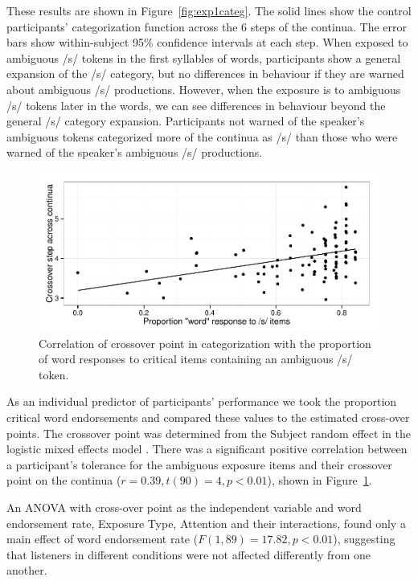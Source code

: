 These results are shown in Figure~\ref{fig:exp1categ}.  
The solid lines show the control participants' categorization function across the 6 steps of the continua.  
The error bars show within-subject 95\% confidence intervals at each step.  
When exposed to ambiguous /s/ tokens in the first syllables of words, participants show a general expansion of the /s/ category, but no differences in behaviour if they are warned about ambiguous /s/ productions.  
However, when the exposure is to ambiguous /s/ tokens later in the words, we can see differences in behaviour beyond the general /s/ category expansion.  
Participants not warned of the speaker's ambiguous tokens categorized more of the continua as /s/ than those who were warned of the speaker's ambiguous /s/ productions.

\begin{figure}[!ht]

\caption{Correlation of crossover point in categorization with the proportion of word responses to critical items containing an ambiguous /s/ token.}\label{fig:exp1xover}
\begin{center}
\includegraphics[width=\textwidth]{graphs/exp1_xoverwordresp}
\end{center}
\end{figure}

As an individual predictor of participants' performance we took the proportion critical word endorsements and compared these values to the estimated cross-over points. 
The crossover point was determined from the Subject random effect in the logistic mixed effects model \citep{Kleber2011}. 
There was a significant positive correlation between a participant's tolerance for the ambiguous exposure items and their crossover point on the continua ($r = 0.39, t (90) = 4, p < 0.01$), shown in Figure~\ref{fig:exp1xover}.

An ANOVA with cross-over point as the independent variable and word endorsement rate, Exposure Type, Attention and their interactions, found only a main effect of word endorsement rate ($F(1,89) = 17.82, p < 0.01$), suggesting that listeners in different conditions were not affected differently from one another.

